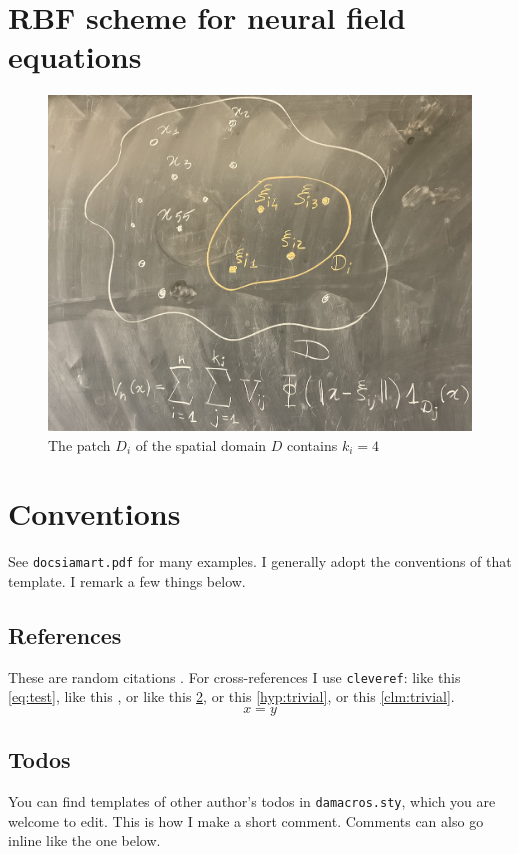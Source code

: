 \documentclass[a4paper]{siamart190516}
\begin{document}
\section{RBF scheme for neural field equations}\label{sec:RBFScheme} 
\begin{figure}
  \centering
  \includegraphics[width=\textwidth]{sketch}
  \caption{The patch $D_i$ of the spatial domain $D$ contains $k_i =4$}
  \label{fig:sketch}
\end{figure}

\section{Conventions} \label{sec:conventions}
See \texttt{docsiamart.pdf} for many examples. I generally adopt the conventions of
that template. I remark a few things below.

\subsection{References} \label{sec:references}
These are random citations \cite{KoMa14,siam}. For cross-references I use
\texttt{cleveref}: like this
\cref{eq:test}, like this , or like this \cref{sec:conventions}, or
this \cref{hyp:trivial}, or this \cref{clm:trivial}.
\begin{equation}\label{eq:test}
  x = y
\end{equation}

\subsection{Todos}
You can find templates of other author's todos in
\texttt{damacros.sty}, which you are welcome to edit.
This is how I make a short comment. Comments can also go
inline like the one below.
% 
\end{document}
